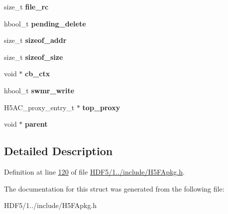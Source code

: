 \begin{DoxyCompactItemize}
size\+\_\+t {\bfseries file\+\_\+rc}
\item 
\mbox{\label{struct_h5_f_a__hdr__t_ad94d8b1592e5b0bef58f57b6912739a8}} 
hbool\+\_\+t {\bfseries pending\+\_\+delete}
\item 
\mbox{\label{struct_h5_f_a__hdr__t_a4a99fe5dfdd3fa6859614d13ff1541f2}} 
size\+\_\+t {\bfseries sizeof\+\_\+addr}
\item 
\mbox{\label{struct_h5_f_a__hdr__t_a96c650885e8cb3aa54389573d949ec31}} 
size\+\_\+t {\bfseries sizeof\+\_\+size}
\item 
\mbox{\label{struct_h5_f_a__hdr__t_a20036f0fb9efe054a9b844a19eb1f6d9}} 
void $\ast$ {\bfseries cb\+\_\+ctx}
\item 
\mbox{\label{struct_h5_f_a__hdr__t_a31602115f4660b9f1c56bd18a6c06927}} 
hbool\+\_\+t {\bfseries swmr\+\_\+write}
\item 
\mbox{\label{struct_h5_f_a__hdr__t_a7f6acf3ef6b090e3b159341cc561c7e9}} 
H5\+A\+C\+\_\+proxy\+\_\+entry\+\_\+t $\ast$ {\bfseries top\+\_\+proxy}
\item 
\mbox{\label{struct_h5_f_a__hdr__t_ad2e0d0cc9b315203bf03dba1e806ab0d}} 
void $\ast$ {\bfseries parent}
\end{DoxyCompactItemize}


\subsection{Detailed Description}


Definition at line \hyperlink{_h_d_f5_21_810_81_2include_2_h5_f_apkg_8h_source_l00120}{120} of file \hyperlink{_h_d_f5_21_810_81_2include_2_h5_f_apkg_8h_source}{H\+D\+F5/1../include/\+H5\+F\+Apkg.\+h}.



The documentation for this struct was generated from the following file\+:\begin{DoxyCompactItemize}
\item 
H\+D\+F5/1../include/\+H5\+F\+Apkg.\+h\end{DoxyCompactItemize}
